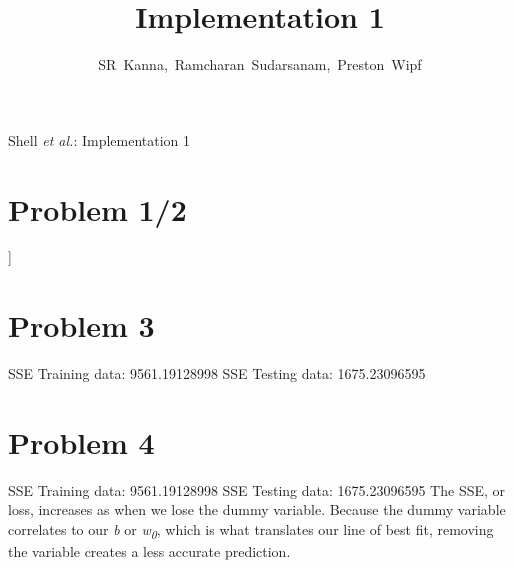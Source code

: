 \documentclass[journal]{IEEEtran}
\begin{document}
\onecolumn

\title{Implementation 1}
\author{SR~Kanna,~Ramcharan~Sudarsanam,~Preston~Wipf}%

%
{Shell \MakeLowercase{\textit{et al.}}: Implementation 1}

\maketitle
\bigskip



\section{Problem 1/2}
\noindent [[  3.95843212e+01] \newline
\noindent [ -1.01137046e-01] \newline
\noindent [  4.58935299e-02] \newline
\noindent [ -2.73038670e-03] \newline
\noindent [  3.07201340e+00] \newline
\noindent [ -1.72254072e+01] \newline
\noindent [  3.71125235e+00] \newline
\noindent [  7.15862492e-03] \newline
\noindent [ -1.59900210e+00] \newline
\noindent [  3.73623375e-01] \newline
\noindent [ -1.57564197e-02] \newline
\noindent [ -1.02417703e+00] \newline
\noindent [  9.69321451e-03] \newline
\noindent [ -5.85969273e-01]] \newline
\medskip

\section{Problem 3}
\noindent SSE Training data: 9561.19128998 \newline
\noindent SSE Testing data:  1675.23096595 \newline
\medskip

\section{Problem 4}
\noindent SSE Training data: 9561.19128998 \newline
\noindent SSE Testing data:  1675.23096595 \newline
\noindent The SSE, or loss, increases as when we lose the dummy variable.
Because the dummy variable correlates to our \textit{b} or \textit{w\textsubscript{0}},
which is what translates our line of best fit, removing the variable creates a less
accurate prediction. \newline
\medskip
\end{document}

